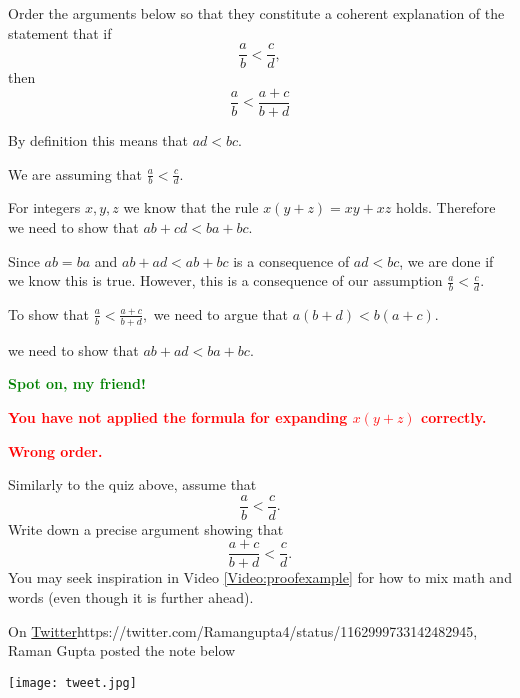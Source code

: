 \documentclass{article}
\newcommand{\red}[1]{\textcolor{red}{\textbf{#1}}}
\newcommand{\green}[1]{\textcolor{green}{\textbf{#1}}}
\begin{document}
\begin{quizexercise}[showhide]
\begin{orderquiz}
  \question
  Order the arguments below so that they constitute a coherent explanation of the
  statement that if
  $$
  \frac{a}{b} < \frac{c}{d},
  $$
  then
  $$
  \frac{a}{b} < \frac{a + c}{b + d}
  $$

  
  \answer %
  By definition this means that $a d < b c$.

  
  
 \answer %
  We are assuming that $\frac{a}{b} < \frac{c}{d}$. 

  \answer %
  For integers $x, y, z$ we know that the rule
  $
  x ( y + z) = x y + x z
  $
  holds. Therefore
  \answer %
  we need to show that $a b + c d < b a + b c$.

  
  \answer %
  Since $a b = b a$ and $a b + a d < a b + b c$ is a consequence of $a d < b c$, we are
  done if we know this is true.
  \answer %
  However, this is a consequence of our assumption $\frac{a}{b} < \frac{c}{d}$.

\answer %
  To show that
  $
  \frac{a}{b} < \frac{a+c}{b + d},
  $
  we need to argue that $a (b + d) < b (a + c)$.

  
  \answer

  we need to show that $a b + a d < b a + b c$.
  

  \green{Spot on, my friend!}

  \red{You have not applied the formula for expanding $x(y + z)$ correctly.}

  \red{Wrong order.}

\end{orderquiz}
\end{quizexercise}




\beginshex
Similarly to the quiz above, assume that  
$$
  \frac{a}{b} < \frac{c}{d}.
  $$
  Write down a precise argument showing that
  $$
  \frac{a + c}{b + d} < \frac{c}{d}.
  $$
  You may seek inspiration in Video \ref{Video:proofexample} for
  how to mix math and words (even though
  it is further ahead).
  \endshex

  
  

\beginshex
On \url{Twitter}{https://twitter.com/Ramangupta4/status/1162999733142482945}, Raman Gupta posted the note below

\texttt{[image: tweet.jpg]}
\end{document}
